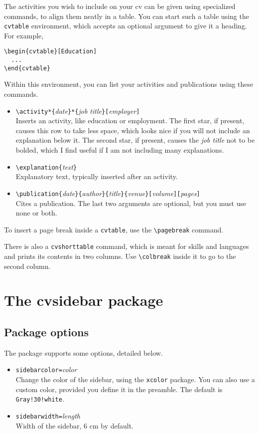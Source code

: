\documentclass{article}
\begin{document}
The activities you wish to include on your cv can be given using specialized commands, to align them neatly in a table.
You can start such a table using the \texttt{cvtable} environment, which accepts an optional argument to give it a heading. For example,
\begin{verbatim}
\begin{cvtable}[Education]
  ...
\end{cvtable}
\end{verbatim}
Within this environment, you can list your activities and publications using these commands.
\begin{itemize}
	\item \texttt{\textbackslash{}activity*\{}\textit{date}\texttt{\}*\{}\textit{job title}\texttt{\}[}\textit{employer}\texttt{]} \\
		Inserts an activity, like education or employment.
		The first star, if present, causes this row to take less space, which looks nice if you will not include an explanation below it.
		The second star, if present, causes the \textit{job title} not to be bolded, which I find useful if I am not including many explanations.
	\item \texttt{\textbackslash{}explanation\{}\textit{text}\texttt{\}} \\
		Explanatory text, typically inserted after an activity.
	\item \texttt{\textbackslash{}publication\{}\textit{date}\texttt{\}\{}\textit{author}\texttt{\}\{}\textit{title}\texttt{\}\{}\textit{venue}\texttt{\}[}\textit{volume}\texttt{][}\textit{pages}\texttt{]} \\
		Cites a publication. The last two arguments are optional, but you must use none or both.
\end{itemize}

To insert a page break inside a \texttt{cvtable}, use the \texttt{\textbackslash{}pagebreak} command.

There is also a \texttt{cvshorttable} command, which is meant for skills and languages and prints its contents in two columns.
Use \texttt{\textbackslash{}colbreak} inside it to go to the second column.

\section{The cvsidebar package}
\subsection{Package options}
The package supports some options, detailed below.
\begin{itemize}
	\item \texttt{sidebarcolor=}\textit{color} \\
		Change the color of the sidebar, using the \texttt{xcolor} package.
		You can also use a custom color, provided you define it in the preamble.
		The default is \texttt{Gray!30!white}.
	\item \texttt{sidebarwidth=}\textit{length} \\
		Width of the sidebar, 6 cm by default.
\end{itemize}
\end{document}
